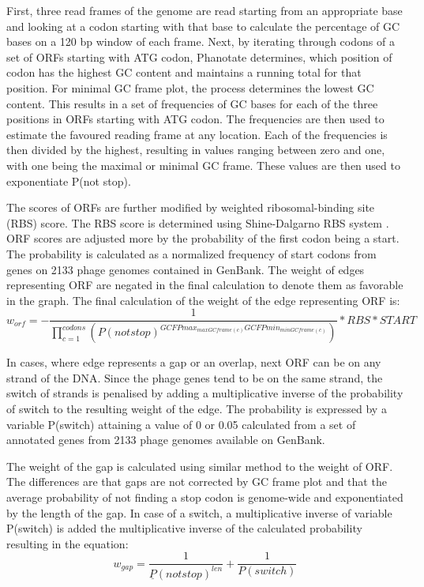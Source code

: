First, three read frames of the genome are read starting from an appropriate base and looking at a codon starting with that base to calculate the percentage of GC bases on a 120 bp window of each frame. Next, by iterating through codons of a set of ORFs starting with ATG codon, Phanotate determines, which position of codon has the highest GC content and maintains a running total for that position. For minimal GC frame plot, the process determines the lowest GC content. This results in a set of frequencies of GC bases for each of the three positions in ORFs starting with ATG codon. The frequencies are then used to estimate the favoured reading frame at any location. Each of the frequencies is then divided by the highest, resulting in values ranging between zero and one, with one being the maximal or minimal GC frame. These values are then used to exponentiate P(not stop).

The scores of ORFs are further modified by weighted ribosomal-binding site (RBS) score. The RBS score is determined using Shine-Dalgarno RBS system \cite{hyatt2010prodigal}. ORF scores are adjusted more by the probability of the first codon being a start. The probability is calculated as a normalized frequency of start codons from genes on 2133 phage genomes contained in GenBank. The weight of edges representing ORF are negated in the final calculation to denote them as favorable in the graph. The final calculation of the weight of the edge representing ORF is:
\[ w_{orf} = - \frac{1}{\prod\limits_{c=1}^{codons}(P(not stop)^{GCFPmax_{maxGCframe(c)} GCFPmin_{minGCframe(c)}})} * RBS * START \]

In cases, where edge represents a gap or an overlap, next ORF can be on any strand of the DNA. Since the phage genes tend to be on the same strand, the switch of strands is penalised by adding a multiplicative inverse of the probability of switch to the resulting weight of the edge. The probability is expressed by a variable P(switch) attaining a value of 0 or 0.05 calculated from a set of annotated genes from 2133 phage genomes available on GenBank.

The weight of the gap is calculated using similar method to the weight of ORF. The differences are that gaps are not corrected by GC frame plot and that the average probability of not finding a stop codon is genome-wide and exponentiated by the length of the gap. In case of a switch, a multiplicative inverse of variable P(switch) is added the multiplicative inverse of the calculated probability resulting in the equation:
\[w_{gap} = \frac{1}{\underline{P}(not stop)^{len}} + \frac{1}{P(switch)}\]

